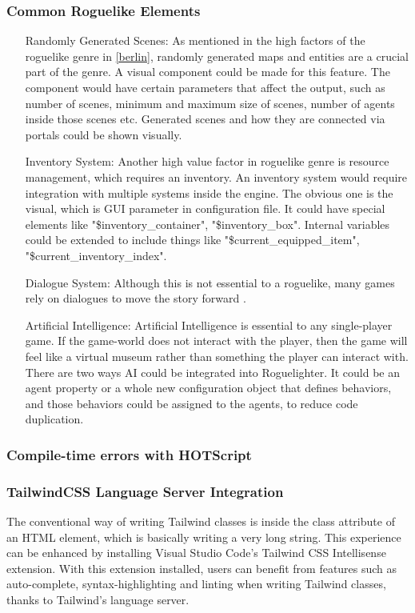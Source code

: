 \documentclass{article}
\begin{document}
\subsubsection{Common Roguelike Elements}
\begin{itemize}
    \item[Randomly Generated Scenes:] As mentioned in the high factors of the roguelike genre in \ref{berlin}, randomly generated maps and entities are a crucial part of the genre. A visual component could be made for this feature. The component would have certain parameters that affect the output, such as number of scenes, minimum and maximum size of scenes, number of agents inside those scenes etc. Generated scenes and how they are connected via portals could be shown visually.
    
    \item[Inventory System:] Another high value factor in roguelike genre is resource management, which requires an inventory. An inventory system would require integration with multiple systems inside the engine. The obvious one is the visual, which is GUI parameter in configuration file. It could have special elements like "\$inventory\_container", "\$inventory\_box". Internal variables could be extended to include things like "\$current\_equipped\_item", "\$current\_inventory\_index".
    
    \item[Dialogue System:] Although this is not essential to a roguelike, many games rely on dialogues to move the story forward . 
    \item[Artificial Intelligence:] Artificial Intelligence is essential to any single-player game. If the game-world does not interact with the player, then the game will feel like a virtual museum rather than something the player can interact with.\\

    There are two ways AI could be integrated into Roguelighter. It could be an agent property or a whole new configuration object that defines behaviors, and those behaviors could be assigned to the agents, to reduce code duplication.
\end{itemize}
\subsubsection{Compile-time errors with HOTScript}
\subsubsection{TailwindCSS Language Server Integration}
The conventional way of writing Tailwind classes is inside the class attribute of an HTML element, which is basically writing a very long string. This experience can be enhanced by installing Visual Studio Code's Tailwind CSS Intellisense extension. With this extension installed, users can benefit from features such as auto-complete, syntax-highlighting and linting when writing Tailwind classes, thanks to Tailwind's language server.\\
\end{document}
